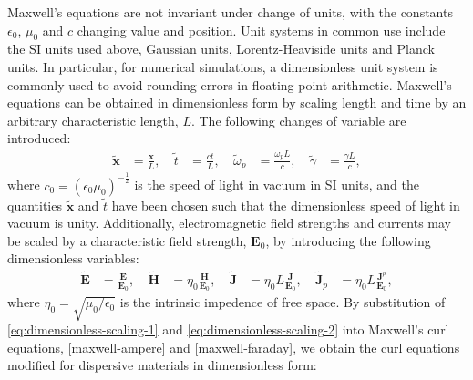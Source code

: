 Maxwell's equations are not invariant under change of units, with the constants $\epsilon_0$, $\mu_0$ and $c$ changing value and position. Unit systems in common use include the SI units used above, Gaussian units, Lorentz-Heaviside units and Planck units.
In particular, for numerical simulations, a dimensionless unit system is commonly used to avoid rounding errors in floating point arithmetic. Maxwell's equations can be obtained in dimensionless form by scaling length and time by an arbitrary characteristic length, $L$. The following changes of variable are introduced:
    \begin{align}
        \label{eq:dimensionless-scaling-1}
        \tilde{\mathbf{x}} &= \frac{\mathbf{x}}{L}, &  \
        \tilde{t} &= \frac{ct}{L}, &  \
        \tilde{\omega}_p &= \frac{\omega_p L}{c}, & \
        \tilde{\gamma} &= \frac{\gamma L}{c},
    \end{align}
where $c_0 = ( \epsilon_0 \mu_0 )^{-\frac{1}{2}}$ is the speed of light in vacuum in SI units, and the quantities $\tilde{\mathbf{x}}$ and $\tilde{t}$ have been chosen such that the dimensionless speed of light in vacuum is unity. Additionally, electromagnetic field strengths and currents may be scaled by a characteristic field strength, $\mathbf{E}_0$, by introducing the following dimensionless variables:
    \begin{align}
        \label{eq:dimensionless-scaling-2}
        \tilde{\mathbf{E}} &= \frac{\mathbf{E}}{\mathbf{E}_0}, &  \
        \tilde{\mathbf{H}} &= \eta_0 \frac{\mathbf{H}}{\mathbf{E}_0}, &  \
        \tilde{\mathbf{J}} &= \eta_0 L \frac{\mathbf{J}}{\mathbf{E}_0}, & \
        \tilde{\mathbf{J}}_p &= \eta_0 L \frac{\mathbf{J}^p}{\mathbf{E}_0},
    \end{align}
    where $\eta_0 = \sqrt{\mu_0 / \epsilon_0}$ is the intrinsic impedence of free space. By substitution of \ref{eq:dimensionless-scaling-1} and \ref{eq:dimensionless-scaling-2} into Maxwell's curl equations, \ref{maxwell-ampere} and \ref{maxwell-faraday}, we obtain the curl equations modified for dispersive materials in dimensionless form:
